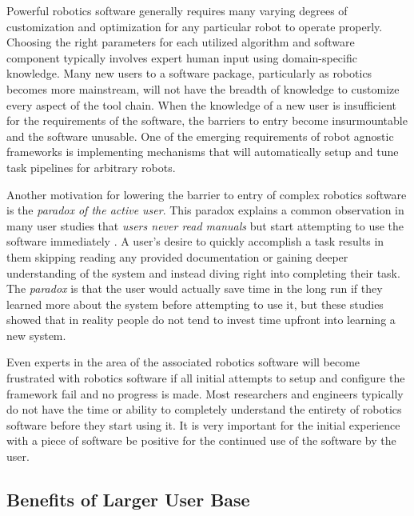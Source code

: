 \documentclass[10pt,journal,compsoc]{joser1}
\begin{document}
{Powerful robotics software generally requires many varying degrees of customization and optimization for any particular robot to operate properly. Choosing the right parameters for each utilized algorithm and software component typically involves expert human input using domain-specific knowledge. Many new users to a software package, particularly as robotics becomes more mainstream, will not have the breadth of knowledge to customize every aspect of the tool chain. When the knowledge of a new user is insufficient for the requirements of the software, the barriers to entry become insurmountable and the software unusable. One of the emerging requirements of robot agnostic frameworks is implementing mechanisms that will automatically setup and tune task pipelines for arbitrary robots.

Another motivation for lowering the barrier to entry of complex robotics software is the \textit{paradox of the active user}. This paradox explains a common observation in many user studies that \textit{users never read manuals} but start attempting to use the software immediately \cite{carroll1987interfacing}. A user's desire to quickly accomplish a task results in them skipping reading any provided documentation or gaining deeper understanding of the system and instead diving right into completing their task. The \textit{paradox} is that the user would actually save time in the long run if they learned more about the system before attempting to use it, but these studies showed that in reality people do not tend to invest time upfront into learning a new system.

Even experts in the area of the associated robotics software will become frustrated with robotics software if all initial attempts to setup and configure the framework fail and no progress is made. Most researchers and engineers typically do not have the time or ability to completely understand the entirety of robotics software before they start using it. It is very important for the initial experience with a piece of software be positive for the continued use of the software by the user.

\subsection{Benefits of Larger User Base}

}
\end{document}
